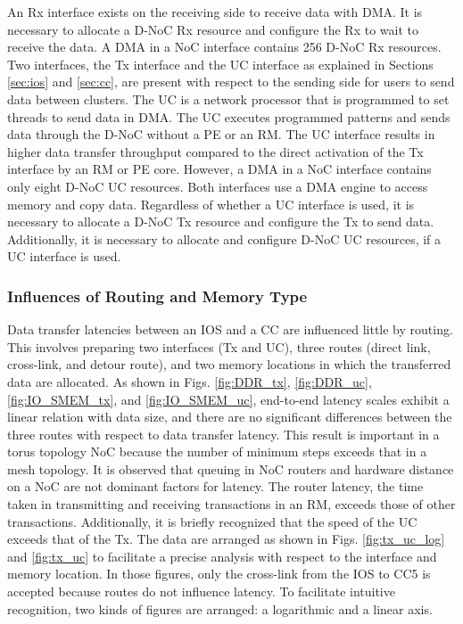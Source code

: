   An Rx interface exists on the receiving side to receive data with DMA.
  It is necessary to allocate a D-NoC Rx resource and configure the Rx to wait to receive the data.
  A DMA in a NoC interface contains 256 D-NoC Rx resources.
  Two interfaces, the Tx interface and the UC interface as explained in Sections \ref{sec:ios} and \ref{sec:cc},
  are present with respect to the sending side for users to send data between clusters.
  The UC is a network processor that is programmed to set threads to send data in DMA.
  The UC executes programmed patterns and sends data through the D-NoC without a PE or an RM.
  The UC interface results in higher data transfer throughput compared to the direct activation of the Tx interface by an RM or PE core.
  However, a DMA in a NoC interface contains only eight D-NoC UC resources.
  Both interfaces use a DMA engine to access memory and copy data.
  Regardless of whether a UC interface is used, it is necessary to allocate a D-NoC Tx resource and configure the Tx to send data.
  Additionally, it is necessary to allocate and configure D-NoC UC resources, if a UC interface is used.
  
  \subsubsection{Influences of Routing and Memory Type}
  \label{sec:routing_and_memory}
  
  Data transfer latencies between an IOS and a CC are influenced little by routing.
  This involves preparing two interfaces (Tx and UC), three routes (direct link, cross-link, and detour route), and two memory locations in which the transferred data are allocated.
  As shown in Figs. \ref{fig:DDR_tx}, \ref{fig:DDR_uc}, \ref{fig:IO_SMEM_tx}, and \ref{fig:IO_SMEM_uc}, 
  end-to-end latency scales exhibit a linear relation with data size, and there are no significant differences between the three routes with respect to data transfer latency.
  This result is important in a torus topology NoC because the number of minimum steps exceeds that in a mesh topology. 
  It is observed that queuing in NoC routers and hardware distance on a NoC are not dominant factors for latency.
  The router latency, the time taken in transmitting and receiving transactions in an RM, exceeds those of other transactions.
  Additionally, it is briefly recognized that the speed of the UC exceeds that of the Tx.
  The data are arranged as shown in Figs. \ref{fig:tx_uc_log} and \ref{fig:tx_uc} to facilitate a precise analysis with respect to the interface and memory location.
  In those figures, only the cross-link from the IOS to CC5 is accepted because routes do not influence latency.
  To facilitate intuitive recognition, two kinds of figures are arranged: a logarithmic and a linear axis.

